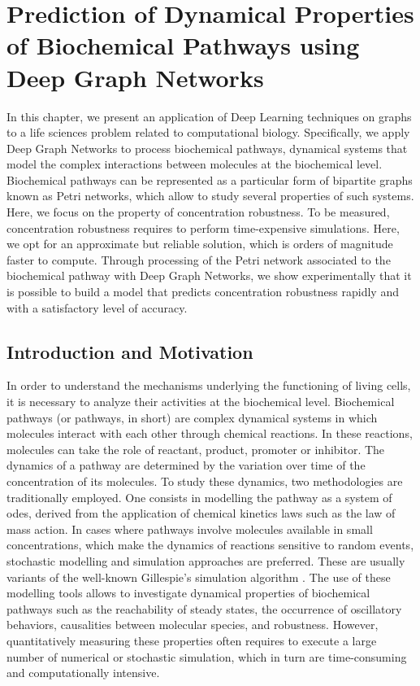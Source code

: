 \chapter{Prediction of Dynamical Properties of Biochemical Pathways using Deep Graph Networks}\label{ch:prediction-biochemical-dgn}

In this chapter, we present an application of Deep Learning techniques on graphs to a life sciences problem related to computational biology. Specifically, we apply Deep Graph Networks to process biochemical pathways, \ie dynamical systems that model the complex interactions between molecules at the biochemical level. Biochemical pathways can be represented as a particular form of bipartite graphs known as Petri networks, which allow to study several properties of such systems. Here, we focus on the property of concentration robustness. To be measured, concentration robustness requires to perform time-expensive simulations. Here, we opt for an approximate but reliable solution, which is orders of magnitude faster to compute. Through processing of the Petri network associated to the biochemical pathway with Deep Graph Networks, we show experimentally that it is possible to build a model that predicts concentration robustness rapidly and with a satisfactory level of accuracy.

\section{Introduction and Motivation}
In order to understand the mechanisms underlying the functioning of living cells, it is necessary to analyze their activities at the biochemical level. Biochemical pathways (or pathways, in short) are complex dynamical systems in which molecules interact with each other through chemical reactions. In these reactions, molecules can take the role of reactant, product, promoter or inhibitor. The dynamics of a pathway are determined by the variation over time of the concentration of its molecules. To study these dynamics, two methodologies are traditionally employed. One consists in modelling the pathway as a system of \glspl{ode}, derived from the application of chemical kinetics laws such as the law of mass action. In cases where pathways involve molecules available in small concentrations, which make the dynamics of reactions sensitive to random events, stochastic modelling and simulation approaches are preferred. These are usually variants of the well-known Gillespie's simulation algorithm \citep{gillespie1977exact}. The use of these modelling tools allows to investigate dynamical properties of biochemical pathways such as the reachability of steady states, the occurrence of oscillatory behaviors, causalities between molecular species, and robustness. However, quantitatively measuring these properties often requires to execute a large number of numerical or stochastic simulation, which in turn are time-consuming and computationally intensive.

